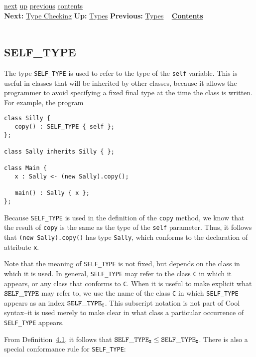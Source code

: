 \documentclass[]{article}
\begin{document}
\href{node9.html}{next} \href{node7.html}{up}
\href{node7.html}{previous} \href{node1.html}{contents} \\
\textbf{Next:} \href{node9.html}{Type Checking} \textbf{Up:}
\href{node7.html}{Types} \textbf{Previous:} \href{node7.html}{Types} ~
\textbf{\href{node1.html}{Contents}} \\ \\

\subsection{SELF\_TYPE}

The type \texttt{SELF\_TYPE} is used to refer to the type of the
\texttt{self} variable. This is useful in classes that will be inherited
by other classes, because it allows the programmer to avoid specifying a
fixed final type at the time the class is written. For example, the
program

\begin{verbatim}
class Silly {
   copy() : SELF_TYPE { self };
};

class Sally inherits Silly { };

class Main {
   x : Sally <- (new Sally).copy();

   main() : Sally { x };
};
\end{verbatim}

Because \texttt{SELF\_TYPE} is used in the definition of the
\texttt{copy} method, we know that the result of \texttt{copy} is the
same as the type of the \texttt{self} parameter. Thus, it follows that
\texttt{(new Sally).copy()} has type \texttt{Sally}, which conforms to
the declaration of attribute \texttt{x}.

Note that the meaning of \texttt{SELF\_TYPE} is not fixed, but depends
on the class in which it is used. In general, \texttt{SELF\_TYPE} may
refer to the class \texttt{C} in which it appears, or any class that
conforms to \texttt{C}. When it is useful to make explicit what
${\tt SELF\_TYPE}$ may refer to, we use the name of the class \texttt{C}
in which \texttt{SELF\_TYPE} appears as an index
${\tt SELF\_TYPE}_{\tt C}$. This subscript notation is not part of Cool
syntax--it is used merely to make clear in what class a particular
occurrence of \texttt{SELF\_TYPE} appears.

From Definition~\href{node7.html\#def-conforms}{4.1}, it follows that
${\tt SELF\_TYPE}_{\tt X} \leq {\tt SELF\_TYPE}_{\tt X}$. There is also
a special conformance rule for \texttt{SELF\_TYPE}: \\
\end{document}
